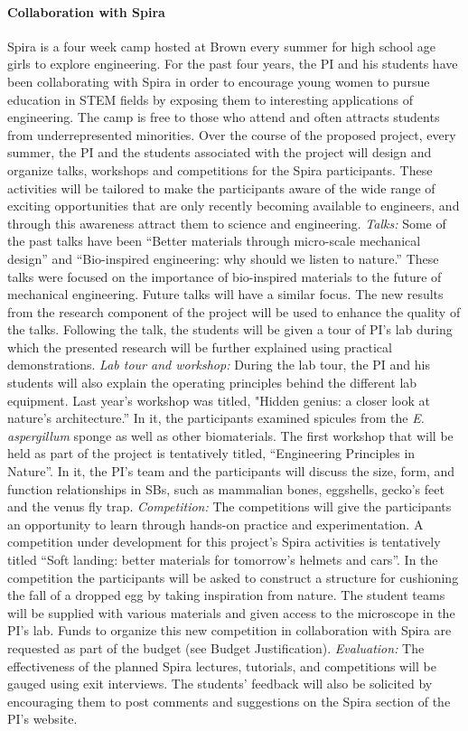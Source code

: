 \documentclass[10pt,letterpaper]{article}
\begin{document}
  \paragraph{Collaboration with Spira}
    Spira is a four week camp hosted at Brown every summer for high school age girls to explore engineering. For the past four years, the PI and his students have been collaborating with Spira in order to encourage young women to pursue education in STEM fields by exposing them to interesting applications of engineering. The camp is free to those who attend and often attracts students from underrepresented minorities.  Over the course of the proposed project, every summer, the PI and the students associated with the project will design and organize talks, workshops and competitions for the Spira participants. These activities will be tailored to make the participants aware of the wide range of exciting opportunities that are only recently becoming available to engineers, and through this awareness attract them to science and engineering. \emph{Talks:} Some of the past talks have been  ``Better materials through micro-scale mechanical design'' and ``Bio-inspired engineering: why should we listen to nature.'' These talks were focused on the importance of bio-inspired materials to the future of mechanical engineering. Future talks will have a similar focus. The new results from the research component of the project will be used to enhance the quality of the talks. Following the talk, the students will be given a tour of PI's lab during which the presented research will be further explained using practical demonstrations. \emph{Lab tour and workshop:} During the lab tour, the PI and his students will also explain the operating principles behind the different lab equipment. Last year's workshop was titled, "Hidden genius: a closer look at nature's architecture.'' In it, the participants examined spicules from the \textit{E. aspergillum} sponge as well as other biomaterials. The first workshop that will be held as part of the project is tentatively titled, ``Engineering Principles in Nature''.  In it, the PI's team and the participants will discuss the size, form, and function relationships in SBs, such as mammalian bones, eggshells, gecko's feet and the venus fly trap. \emph{Competition:} The competitions will give the participants an opportunity to learn through hands-on practice and experimentation. A competition under development for this project's Spira activities is tentatively titled ``Soft landing: better materials for tomorrow's helmets and cars''. In the competition the participants will be asked to construct a structure for cushioning the fall of a dropped egg by taking inspiration from nature. The student teams will be supplied with various materials and given access to the microscope in the PI's lab. Funds to organize this new competition in collaboration with Spira are requested as part of the budget (see Budget Justification). \emph{Evaluation:} The effectiveness of the planned Spira lectures, tutorials, and competitions will be gauged using exit interviews. The students' feedback will also be solicited by encouraging them to post comments and suggestions on the Spira section of the PI's website.
\end{document}
